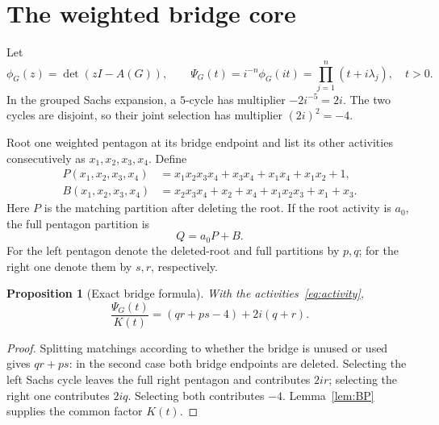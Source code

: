 \documentclass[11pt]{article}
\newtheorem{proposition}[theorem]{Proposition}
\theoremstyle{remark}
\begin{document}
\section{The weighted bridge core}

Let
\[
 \phi_G(z)=\det(zI-A(G)),
 \qquad
 \Psi_G(t)=i^{-n}\phi_G(it)=\prod_{j=1}^n(t+i\lambda_j),
 \quad t>0.
\]
In the grouped Sachs expansion, a $5$-cycle has multiplier
$-2i^{-5}=2i$.  The two cycles are disjoint, so their joint selection has
multiplier $(2i)^2=-4$.

Root one weighted pentagon at its bridge endpoint and list its other
activities consecutively as $x_1,x_2,x_3,x_4$.  Define
\begin{align}
 P(x_1,x_2,x_3,x_4)
 &=x_1x_2x_3x_4+x_3x_4+x_1x_4+x_1x_2+1,\label{eq:P}\\
 B(x_1,x_2,x_3,x_4)
 &=x_2x_3x_4+x_2+x_4+x_1x_2x_3+x_1+x_3.\label{eq:B}
\end{align}
Here $P$ is the matching partition after deleting the root.  If the root
activity is $a_0$, the full pentagon partition is
\begin{equation}\label{eq:Q}
 Q=a_0P+B.
\end{equation}
For the left pentagon denote the deleted-root and full partitions by $p,q$;
for the right one denote them by $s,r$, respectively.

\begin{proposition}[Exact bridge formula]\label{prop:bridge}
With the activities~\eqref{eq:activity},
\begin{equation}\label{eq:bridge-formula}
 \boxed{\quad
 \frac{\Psi_G(t)}{K(t)}=(qr+ps-4)+2i(q+r).
 \quad}
\end{equation}
\end{proposition}

\begin{proof}
Splitting matchings according to whether the bridge is unused or used gives
$qr+ps$: in the second case both bridge endpoints are deleted.  Selecting
the left Sachs cycle leaves the full right pentagon and contributes $2ir$;
selecting the right one contributes $2iq$.  Selecting both contributes
$-4$.  Lemma~\ref{lem:BP} supplies the common factor $K(t)$.
\end{proof}
\end{document}
